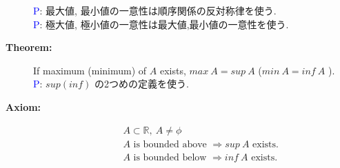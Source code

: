 \documentclass[english,dvipdfmx]{jsarticle}
\newcommand*{\proof}{\textcircled{\textcolor{blue}{\scriptsize P}}}
\begin{document}
\begin{description}
        \proof : 最大値, 最小値の一意性は順序関係の反対称律を使う. \\
        \proof : 極大値, 極小値の一意性は最大値,最小値の一意性を使う.
    \item[\bf{Theorem:}] If maximum (minimum) of $A$ exists, $max \ A = sup \ A$ ($min \ A = inf \ A$ ). \\
        \proof : $sup(inf)$ の2つめの定義を使う.
    \item[\bf{Axiom:}] {\color{cyan}{Existance of supremum and infimum}}
        \begin{eqnarray*}
            & &A \subset \mathbb{R},\ A \neq \phi \\
            & &A \text{ is bounded above } \Rightarrow sup \ A \text{ exists.} \\
            & &A \text{ is bounded below } \Rightarrow inf \ A \text{ exists.}
        \end{eqnarray*}
\end{description}
\newpage
\end{document}
